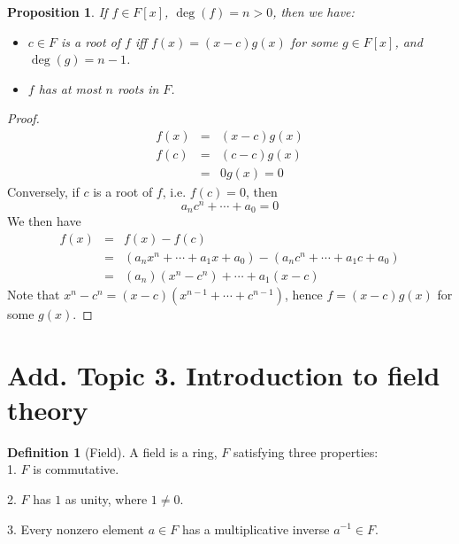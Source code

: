 \documentclass{article}
\theoremstyle{MyNonumberplain}
\theoremstyle{break}
\newtheorem*{proof}{Proof. }
\theoremstyle{break}
\newtheorem{proposition}{Proposition}[section]
\theoremstyle{break}
\theoremstyle{definition}
\theoremstyle{break}
\newtheorem{definition}{Definition}[section]
\begin{document}
\begin{thmbox}
    \begin{proposition}
        If $f \in F [x]$, $\deg (f) = n > 0$, then we have:\\
        \begin{itemize}
          \item $c \in F$ is a root of $f$ iff $f (x) = (x - c) g (x)$ for some $g \in
          F [x]$, and $\deg (g) = n - 1$.\bigskip
          
          \item $f$ has at most $n$ roots in $F$. 
        \end{itemize}
    \end{proposition}
    \begin{prfbox}
        \begin{proof}
            \begin{eqnarray*}
                f (x) & = & (x - c) g (x)\\
                f (c) & = & (c - c) g (x)\\
                & = & 0 g (x) = 0
              \end{eqnarray*}
              Conversely, if $c$ is a root of $f$, i.e. $f (c) = 0$, then
              \[ a_n c^n + \cdots + a_0 = 0 \]
              We then have
              \begin{eqnarray*}
                f (x) & = & f (x) - f (c)\\
                & = & (a_n x^n + \cdots + a_1 x + a_0) - (a_n c^n + \cdots + a_1 c + a_0)\\
                & = & (a_n) (x^n - c^n) + \cdots + a_1 (x - c)
              \end{eqnarray*}
              Note that $x^n - c^n = (x - c) (x^{n - 1} + \cdots + c^{n - 1})$, hence $f =
              (x - c) g (x)$ for some $g (x)$.
        \end{proof}
    \end{prfbox}
\end{thmbox}

\newpage

\section{Add. Topic 3. Introduction to field theory}

\begin{defbox}
    \begin{definition}[Field]
        A field is a ring, $F$ satisfying three properties:\\
    
        1. $F$ is commutative.\bigskip
        
        2. $F$ has $1$ as unity, where $1 \neq 0$.\bigskip
        
        3. Every nonzero element $a \in F$ has a multiplicative inverse $a^{- 1} \in
        F$. 
    \end{definition}
\end{defbox}
\end{document}
